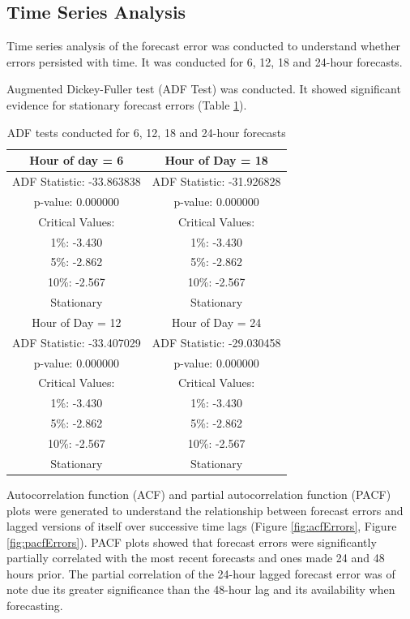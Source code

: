 \documentclass[mstat,12pt]{unswthesis}
\begin{document}
\subsection{Time Series Analysis}\label{time-series-analysis}

Time series analysis of the forecast error was conducted to understand whether errors persisted with time. It was conducted for 6, 12, 18 and 24-hour forecasts.

\bigskip

Augmented Dickey-Fuller test (ADF Test) was conducted. It showed significant evidence for stationary forecast errors (Table \ref{tab:tab3}).

\begin{table}[H]
\caption{ADF tests conducted for 6, 12, 18 and 24-hour forecasts}
\centering
\begin{tabular}{||c||c||}
\hline
Hour of day = 6 & Hour of Day = 18 \\
\hline
ADF Statistic: -33.863838 & ADF Statistic: -31.926828 \\
p-value: 0.000000 & p-value: 0.000000 \\
Critical Values: & Critical Values: \\
 1\%: -3.430  &  1\%: -3.430 \\
 5\%: -2.862 &   5\%: -2.862 \\
 10\%: -2.567 &  10\%: -2.567 \\
Stationary & Stationary \\
\hline
\hline
Hour of Day = 12 & Hour of Day = 24 \\
\hline
ADF Statistic: -33.407029 & ADF Statistic: -29.030458 \\
p-value: 0.000000 & p-value: 0.000000 \\
Critical Values: & Critical Values: \\
 1\%: -3.430 &  1\%: -3.430 \\
 5\%: -2.862 &  5\%: -2.862 \\
 10\%: -2.567 &  10\%: -2.567 \\
Stationary & Stationary \\
\hline
\end{tabular}
\label{tab:tab3}
\end{table}

Autocorrelation function (ACF) and partial autocorrelation function (PACF) plots were generated to understand the relationship between forecast errors and lagged versions of itself over successive time lags (Figure \ref{fig:acfErrors}, Figure \ref{fig:pacfErrors}). PACF plots showed that forecast errors were significantly partially correlated with the most recent forecasts and ones made 24 and 48 hours prior. The partial correlation of the 24-hour lagged forecast error was of note due its greater significance than the 48-hour lag and its availability when forecasting.
\end{document}
